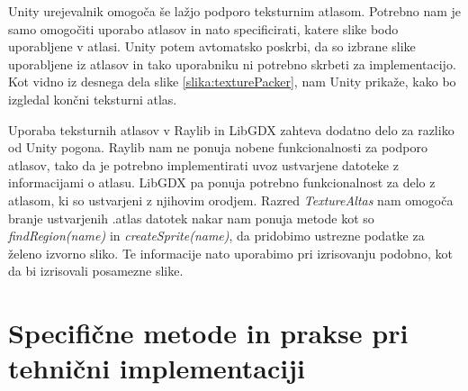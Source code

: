 \documentclass[12pt,a4paper,twoside]{book}
\begin{document}
Unity urejevalnik omogoča še lažjo podporo teksturnim atlasom. Potrebno nam je samo omogočiti uporabo atlasov in nato specificirati, katere slike bodo uporabljene v atlasi. Unity potem avtomatsko poskrbi, da so izbrane slike uporabljene iz atlasov in tako uporabniku ni potrebno skrbeti za implementacijo. Kot vidno iz desnega dela slike \ref{slika:texturePacker}, nam Unity prikaže, kako bo izgledal končni teksturni atlas.

Uporaba teksturnih atlasov v Raylib in LibGDX zahteva dodatno delo za razliko od Unity pogona. Raylib nam ne ponuja nobene funkcionalnosti za podporo atlasov, tako da je potrebno implementirati uvoz ustvarjene datoteke z informacijami o atlasu. LibGDX pa ponuja potrebno funkcionalnost za delo z atlasom, ki so ustvarjeni z njihovim orodjem. Razred \textit{TextureAltas} nam omogoča branje ustvarjenih .atlas datotek nakar nam ponuja metode kot so \textit{findRegion(name)} in \textit{createSprite(name)}, da pridobimo ustrezne podatke za želeno izvorno sliko. Te informacije nato uporabimo pri izrisovanju podobno, kot da bi izrisovali posamezne slike. 

\section{Specifične metode in prakse pri tehnični implementaciji}
\end{document}
